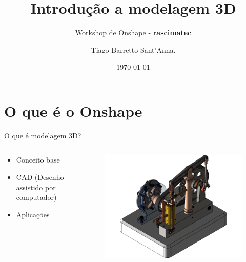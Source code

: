 \documentclass{cubeamer}
\title{Introdução a modelagem 3D}
\subtitle{Workshop de Onshape - \textbf{rascimatec}}
\author[Tiago Barretto Sant'Anna]{Tiago Barretto Sant'Anna.}
\date{\today} %
\institute[SENAI CIMATEC]{SENAI CIMATEC - IEEE ROBOTICS AND AUTOMATION SOCIETY}
\begin{document}
\maketitle

\cutoc

\section{O que é o Onshape}

\begin{frame}{O que é modelagem 3D?}
    \begin{columns}

        \begin{column}{0.4\textwidth}
            \begin{itemize}
                \item Conceito base
                \item CAD (Desenho assistido por computador)
                \item Aplicações
            \end{itemize}
        \end{column}

        \begin{column}{0.6\textwidth}
            \begin{figure}
                \centering
                \includegraphics[height = 0.7\textheight]{img/bomba.png}
                \caption{\cite{Bomba:online}}
            \end{figure}
        \end{column}

    \end{columns}
\end{frame}
\end{document}
